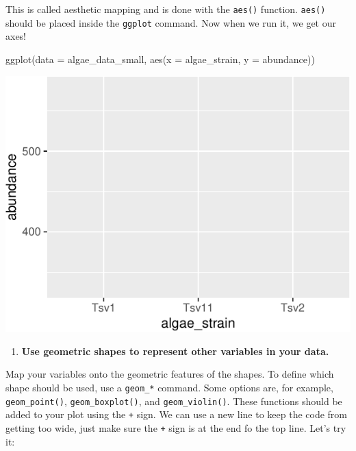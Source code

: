 \documentclass[
]{krantz}
\newenvironment{Shaded}{\begin{snugshade}}{\end{snugshade}}
\newcommand{\AttributeTok}[1]{\textcolor[rgb]{0.77,0.63,0.00}{#1}}
\newcommand{\FunctionTok}[1]{\textcolor[rgb]{0.00,0.00,0.00}{#1}}
\newcommand{\NormalTok}[1]{#1}
\providecommand{\tightlist}{%
  \setlength{\itemsep}{0pt}\setlength{\parskip}{0pt}}
\begin{document}
This is called aesthetic mapping and is done with the \texttt{aes()} function. \texttt{aes()} should be placed inside the \texttt{ggplot} command. Now when we run it, we get our axes!

\begin{Shaded}
\begin{Highlighting}[]
\FunctionTok{ggplot}\NormalTok{(}\AttributeTok{data =}\NormalTok{ algae\_data\_small, }\FunctionTok{aes}\NormalTok{(}\AttributeTok{x =}\NormalTok{ algae\_strain, }\AttributeTok{y =}\NormalTok{ abundance))}
\end{Highlighting}
\end{Shaded}

\begin{center}\includegraphics[width=1\linewidth]{index_files/figure-latex/unnamed-chunk-22-1} \end{center}

\begin{enumerate}
\def\labelenumi{\arabic{enumi}.}
\setcounter{enumi}{2}
\tightlist
\item
  \textbf{Use geometric shapes to represent other variables in your data.}
\end{enumerate}

Map your variables onto the geometric features of the shapes. To define which shape should be used, use a \texttt{geom\_*} command. Some options are, for example, \texttt{geom\_point()}, \texttt{geom\_boxplot()}, and \texttt{geom\_violin()}. These functions should be added to your plot using the \texttt{+} sign. We can use a new line to keep the code from getting too wide, just make sure the \texttt{+} sign is at the end fo the top line. Let's try it:
\end{document}
